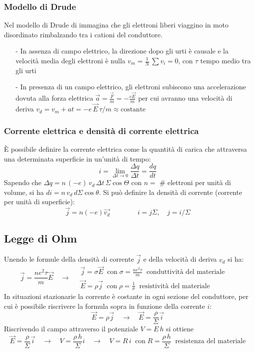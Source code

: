 \documentclass[a4paper]{article}
\begin{document}
\subsubsection*{Modello di Drude}
Nel modello di Drude di immagina che gli elettroni liberi viaggino in moto disordinato rimbalzando tra i cationi del conduttore.
\begin{itemize}[topsep=3pt, itemsep=0pt]
	\item[-] In assenza di campo elettrico, la direzione dopo gli urti è causale e la velocità media degli elettroni è nulla
	\(v_m = \frac{1}{N} \, \sum v_i = 0\), con \(\tau\) tempo medio tra gli urti
	\item[-] In presenza di un campo elettrico, gli elettroni subiscono una accelerazione dovuta alla forza elettrica
	\(\vec{a} = \frac{\vec{F}}{m} = - \frac{e \vec{E}}{m}\) per cui avranno una velocità di deriva \(v_d = v_m + a t = - e \, \vec{E} \, \tau / m \approx \text{costante}\)
\end{itemize}

\subsubsection*{Corrente elettrica e densità di corrente elettrica}
È possibile definire la corrente elettrica come la quantità di carica che attraversa una determinata superficie in un'unità di tempo:
\[i = \lim_{\Delta t \to 0} \frac{\Delta q}{\Delta t} = \frac{dq}{dt}\]
Sapendo che \(\Delta q = n \, (-e) \, v_d \, \Delta t \, \Sigma \cos \Theta\) con \(n =\) \# elettroni per unità di volume, si ha
\(di = n \, v_d \, d\Sigma \cos \theta\).
Si può definire la densità di corrente (corrente per unità di superficie):
\[\vec{j} = n (-e) \vec{v_d} \qquad \qquad i = j \Sigma, \quad j = i / \Sigma\]

\newpage

\subsection{Legge di Ohm}
Unendo le formule della densità di corrente \(\vec{j}\) e della velocità di deriva \(v_d\) si ha:
\[\vec{j} = \frac{n e^2 \tau}{m} \vec{E} \quad \rightarrow \quad \begin{matrix}
	\vec{j} = \sigma \vec{E} \;\; \text{con} \; \sigma = \frac{n e^2 \tau}{m} \;\; \text{conduttività del materiale} \\[10pt]
	\vec{E} = \rho \vec{j} \;\; \text{con} \; \rho = \frac{1}{\sigma} \;\; \text{resistività del materiale} \qquad \quad \,\,
\end{matrix}\]
In situazioni stazionarie la corrente è costante in ogni sezione del conduttore, per cui è possibile riscrivere la formula sopra
in funzione della corrente \(i\):
\[\vec{E} = \rho \vec{j} \quad \rightarrow \quad \vec{E} = \frac{\rho}{\Sigma} \vec{i}\]
Riscrivendo il campo attraverso il potenziale \(V = E \, h\) si ottiene
\[\vec{E} = \frac{\rho}{\Sigma} \vec{i} \quad \rightarrow \quad V = \frac{\rho \, h}{\Sigma} i  \quad \rightarrow \quad V = R \, i \;\; \text{con} \; R = \frac{\rho \, h}{\Sigma} \;\; \text{resistenza del materiale}\]
\end{document}
